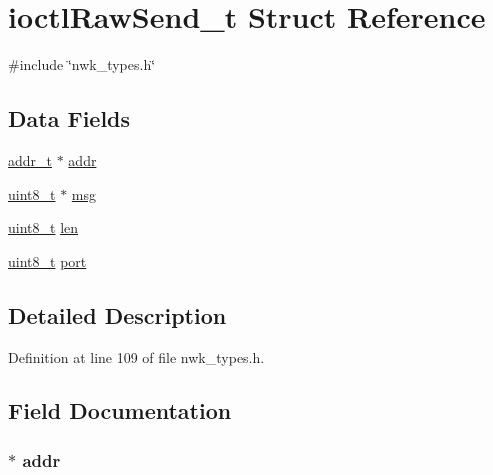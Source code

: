 \hypertarget{structioctlRawSend__t}{\section{ioctl\-Raw\-Send\-\_\-t \-Struct \-Reference}
\label{structioctlRawSend__t}
}


{\ttfamily \#include \char`\"{}nwk\-\_\-types.\-h\char`\"{}}

\subsection*{\-Data \-Fields}
\begin{DoxyCompactItemize}
\item 
\hyperlink{structaddr__t}{addr\-\_\-t} $\ast$ \hyperlink{structioctlRawSend__t_a70c419570d87a9b47ee1157e2c0327f0}{addr}
\item 
\hyperlink{bsp__msp430__defs_8h_aba7bc1797add20fe3efdf37ced1182c5}{uint8\-\_\-t} $\ast$ \hyperlink{structioctlRawSend__t_a8dd37bf01473e324d7c15a19fd211de9}{msg}
\item 
\hyperlink{bsp__msp430__defs_8h_aba7bc1797add20fe3efdf37ced1182c5}{uint8\-\_\-t} \hyperlink{structioctlRawSend__t_a5723e60ffd628510c699eddbce90be23}{len}
\item 
\hyperlink{bsp__msp430__defs_8h_aba7bc1797add20fe3efdf37ced1182c5}{uint8\-\_\-t} \hyperlink{structioctlRawSend__t_a2fa54f9024782843172506fadbee2ac8}{port}
\end{DoxyCompactItemize}


\subsection{\-Detailed \-Description}


\-Definition at line 109 of file nwk\-\_\-types.\-h.



\subsection{\-Field \-Documentation}
\hypertarget{structioctlRawSend__t_a70c419570d87a9b47ee1157e2c0327f0}{
\subsubsection[{addr}]{$\ast$ {\bf addr}}}\label{structioctlRawSend__t_a70c419570d87a9b47ee1157e2c0327f0}


